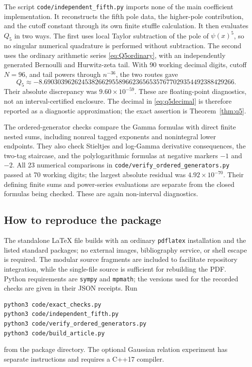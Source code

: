 \documentclass[11pt,a4paper]{article}
\numberwithin{equation}{section}
\theoremstyle{definition}
\theoremstyle{remark}
\begin{document}
The script \texttt{code/independent\_fifth.py} imports none of the main
coefficient implementation.  It reconstructs the fifth pole data,
the higher-pole contribution, and the cutoff constant through its own
finite stuffle calculation.  It then evaluates $Q_5$ in two ways.
The first uses local Taylor subtraction of the pole of $\psi(x)^5$,
so no singular numerical quadrature is performed without subtraction.
The second uses the ordinary arithmetic series
\eqref{eq:Q5ordinary}, with an independently generated Bernoulli and
Hurwitz-zeta tail.  With 90 working decimal digits, cutoff $N=96$,
and tail powers through $n^{-36}$, the two routes gave
\begin{equation}
 Q_5\approx
 -8.69030396262453826629558966236565357677029354492388429266.
 \label{eq:q5decimal}
\end{equation}
Their absolute discrepancy was $9.60\times10^{-59}$.
These are floating-point diagnostics, not an interval-certified
enclosure.  The decimal in \eqref{eq:q5decimal} is therefore reported
as a diagnostic approximation; the exact assertion is
Theorem~\ref{thm:q5}.

The ordered-generator checks compare the Gamma formulas with direct
finite nested sums, including nonreal tagged exponents and nonintegral
lower endpoints.  They also check Stieltjes and log-Gamma derivative
consequences, the two-tag staircase, and the polylogarithmic formulas
at negative markers $-1$ and $-2$.  All 23 numerical comparisons in
\texttt{code/verify\_ordered\_generators.py} passed at 70 working
digits; the largest absolute residual was $4.92\times10^{-70}$.
Their defining finite sums and power-series evaluations are separate
from the closed formulas being checked.  These are again
non-interval diagnostics.

\subsection{How to reproduce the package}

The standalone \LaTeX{} file builds with an ordinary \texttt{pdflatex}
installation and the listed standard packages; no external images,
bibliography service, or shell escape is required.  The modular source
fragments are included to facilitate repository integration, while the
single-file source is sufficient for rebuilding the PDF.  Python
requirements are \texttt{sympy} and \texttt{mpmath}; the versions used
for the recorded checks are given in their JSON receipts.  Run
\begin{verbatim}
python3 code/exact_checks.py
python3 code/independent_fifth.py
python3 code/verify_ordered_generators.py
python3 code/build_article.py
\end{verbatim}
from the package directory.  The optional Gaussian relation experiment
has separate instructions and requires a C++17 compiler.
\end{document}
